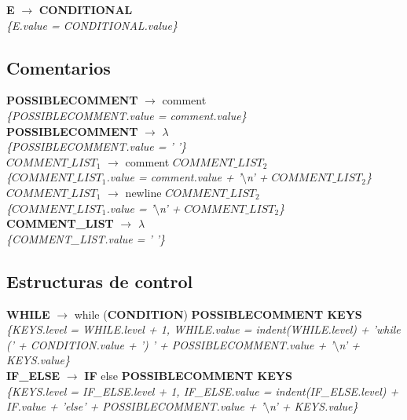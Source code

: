 \documentclass[10pt,a4paper]{article}
\begin{document}
\textbf{E} $\rightarrow$ \textbf{CONDITIONAL} \\
\textit{\{E.value = CONDITIONAL.value\}} \\

\subsection{Comentarios}

\textbf{POSSIBLECOMMENT} $\rightarrow$ comment \\
\textit{\{POSSIBLECOMMENT.value = comment.value\}} \\

\textbf{POSSIBLECOMMENT} $\rightarrow$ $\lambda$ \\
\textit{\{POSSIBLECOMMENT.value = ' '\}} \\

\textbf{$COMMENT\_LIST_{1}$} $\rightarrow$ comment \textbf{$COMMENT\_LIST_{2}$} \\
\textit{\{$COMMENT\_LIST_{1}$.value = comment.value + '$\setminus$n' + $COMMENT\_LIST_{2}$\}} \\

\textbf{$COMMENT\_LIST_{1}$} $\rightarrow$ newline \textbf{$COMMENT\_LIST_{2}$} \\
\textit{\{$COMMENT\_LIST_{1}$.value = '$\setminus$n' + $COMMENT\_LIST_{2}$\}} \\

\textbf{COMMENT\_LIST} $\rightarrow$ $\lambda$ \\
\textit{\{COMMENT\_LIST.value = ' '\}} \\

\subsection{Estructuras de control}
\textbf{WHILE} $\rightarrow$ while (\textbf{CONDITION}) \textbf{POSSIBLECOMMENT KEYS} \\
\textit{\{KEYS.level = WHILE.level + 1, WHILE.value = indent(WHILE.level) + 'while (' + CONDITION.value + ') ' + POSSIBLECOMMENT.value + '$\setminus$n' + KEYS.value\}} \\

\textbf{IF\_ELSE} $\rightarrow$ \textbf{IF} else \textbf{POSSIBLECOMMENT KEYS} \\
\textit{\{KEYS.level = IF\_ELSE.level + 1, IF\_ELSE.value = indent(IF\_ELSE.level) + IF.value + 'else' + POSSIBLECOMMENT.value + '$\setminus$n' + KEYS.value\}} \\
\end{document}
